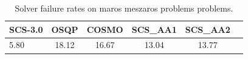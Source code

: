 \begin{table}
\centering
\caption{Solver failure rates on maros meszaros problems problems.}
\label{t-maros meszaros problems-failure}
\begin{tabular}{lccccc}
\toprule
 SCS-3.0 &  OSQP &  COSMO &  SCS\_AA1 &  SCS\_AA2 \\
\midrule
    5.80 & 18.12 &  16.67 &    13.04 &    13.77 \\
\bottomrule
\end{tabular}
\end{table}
